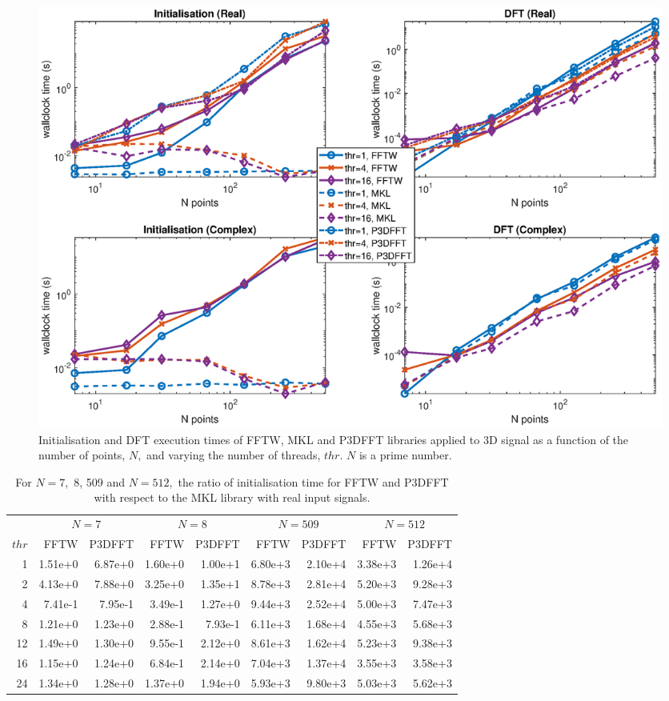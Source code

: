 \documentclass[a4paper]{article}
\begin{document}
\begin{figure}[htb]
    \centering
    \includegraphics[width=0.9\linewidth]{../results/fftw_mkl_p3dfft_prime_3d_thr.eps}
  \caption{Initialisation and DFT execution times of FFTW, MKL and P3DFFT libraries applied to 3D signal as a function of the
    number of points, $N,$ and varying the number of threads, $thr.$ $N$ is a prime number.}
  \label{3DFFTWMKLPrime}
\end{figure}

\begin{table}
\begin{center}
\begin{tabular}{|r||r|r||r|r||r|r||r|r|}
  \hline
  &    \multicolumn{2}{|c||}{$N=7$} & \multicolumn{2}{|c||}{$N=8$} & \multicolumn{2}{|c||}{$N=509$} & \multicolumn{2}{|c|}{$N=512$}  \\
$thr$  & FFTW & P3DFFT & FFTW & P3DFFT & FFTW & P3DFFT & FFTW & P3DFFT  \\  \hline 
   1  &   1.51e+0 &   6.87e+0 &   1.60e+0 &   1.00e+1 &   6.80e+3 &   2.10e+4 &   3.38e+3 &   1.26e+4   \\
   2  &   4.13e+0 &   7.88e+0 &   3.25e+0 &   1.35e+1 &   8.78e+3 &   2.81e+4 &   5.20e+3 &   9.28e+3   \\
   4  &   7.41e-1 &   7.95e-1 &   3.49e-1 &   1.27e+0 &   9.44e+3 &   2.52e+4 &   5.00e+3 &   7.47e+3   \\
   8  &   1.21e+0 &   1.23e+0 &   2.88e-1 &   7.93e-1 &   6.11e+3 &   1.68e+4 &   4.55e+3 &   5.68e+3   \\
   12 &   1.49e+0 &   1.30e+0 &   9.55e-1 &   2.12e+0 &   8.61e+3 &   1.62e+4 &   5.23e+3 &   9.38e+3   \\
   16 &   1.15e+0 &   1.24e+0 &   6.84e-1 &   2.14e+0 &   7.04e+3 &   1.37e+4 &   3.55e+3 &   3.58e+3   \\
   24 &   1.34e+0 &   1.28e+0 &   1.37e+0 &   1.94e+0 &   5.93e+3 &   9.80e+3 &   5.03e+3 &   5.62e+3   \\ \hline
\end{tabular}
\caption{ For $N=7,$ 8, 509 and $N=512,$ the ratio of initialisation time for FFTW and P3DFFT with respect to the MKL library  with real input signals. }\label{Tbl:Init3dr}
\end{center}
\end{table}
\end{document}
